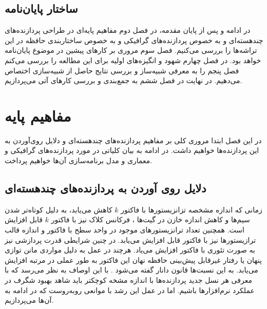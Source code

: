 \documentclass{thesis}
\begin{document}
\section{ساختار پایان‌نامه}

در ادامه و پس از پایان مقدمه، در فصل دوم مفاهیم پایه‌ای در طراحی پردازنده‌های
چندهسته‌ای و به خصوص پردازنده‌های 
گرافیکی و به خصوص ساختاربندی حافظه در این تراشه‌ها را بررسی می‌کنیم. فصل سوم
مروری بر کارهای پیشین در موضوع پایان‌نامه خواهد بود. در فصل چهارم شهود و
انگیزه‌های اولیه برای این مطالعه را بررسی می‌کنم فصل پنجم را به معرفی
شبیه‌ساز و بررسی نتایج حاصل از شبیه‌سازی اختصاص می‌دهیم.
در
نهایت در فصل
ششم
به
جمع‌بندی و بررسی کارهای آتی می‌پردازیم.


\chapter{
مفاهیم پایه‌
}

در این فصل ابتدا مروری کلی بر مفاهیم پردازنده‌های چند‌هسته‌ای و دلایل روی‌آوردن
به این پردازنده‌ها خواهیم داشت. در ادامه به بیان کلیاتی در مورد پردازنده‌های
گرافیکی و معماری و مدل برنامه‌سازی آن‌ها خواهیم پرداخت.

\section{
دلایل روی آوردن به پردازنده‌های چند‌هسته‌ای
}

زمانی که اندازه مشخصه
تزانزیستور‌ها با فاکتور
$k$
کاهش می‌یابد، به دلیل کوتاه‌تر شدن سیم‌ها و کاهش اندازه خازن در گیت‌ها
،
فرکانس کلاک
نیز با فاکتور
$k$
قابل افزایش است. همچنین تعداد ترانزیستور‌های موجود در واحد سطح با فاکتور
و
اندازه قالب
ترازیستور‌ها نیز با فاکتور
قابل افزایش  می‌یابد. در چنین شرایطی قدرت پردازشی نیز به صورت تئوری با فاکتور
افزایش  می‌یاد. هرچند در عمل به دلیل مواردی مانن توازی پنهان
 یا رفتار غیرقابل
پیش‌بینی حافظه نهان
این فاکتور به طور عملی در مرتبه
افزایش می‌یابد. به این نسبت‌ها قانون دانار گفته می‌شود
.
با این اوصاف به نظر می‌رسد که با معرفی هر نسل جدید پردازنده‌ها با اندازه مشخه
کوچکتر باید شاهد بهبود شگرف در عملکرد نرم‌افزارها باشیم. اما در عمل این رشد با
موانعی روبه‌روست که در ادامه به آن‌ها می‌پردازیم.
\end{document}
